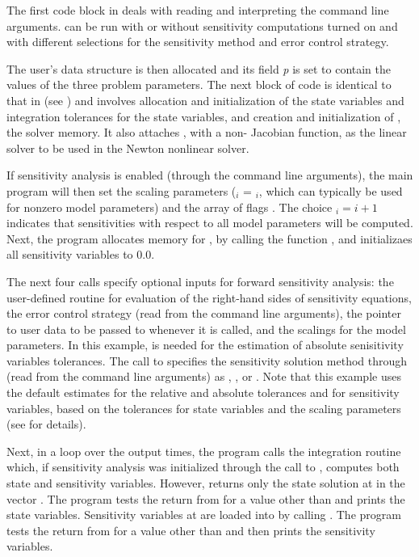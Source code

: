The first code block in  deals with reading and interpreting the
command line arguments.  can be run with or without sensitivity computations
turned on and with different selections for the sensitivity method and error control strategy.

The user's data structure is then allocated and its field {\em p} is set to contain
the values of the three problem parameters.
The next block of code is identical to that in  (see \cite{cvode2.2.0_ex})
and involves allocation and initialization of the state variables and integration 
tolerances for the state variables, and creation and initialization of , 
the {\cvodes} solver memory. 
It also attaches {\cvdense}, with a non- Jacobian function, as the linear solver 
to be used in the Newton nonlinear solver.

If sensitivity analysis is enabled (through the command line arguments), 
the main program will then set the scaling parameters
 ($_i$ = $_i$, which can typically be used for 
nonzero model parameters) and the array of flags . The choice $_i=i+1$
indicates that sensitivities with respect to all model parameters will be computed.
Next, the program allocates memory for , by calling the {\nvecs} function 
, and initializaes all sensitivity variables to $0.0$.

The next four calls specify optional inputs for forward sensitivity analysis:
the user-defined routine for evaluation of the right-hand
sides of sensitivity equations, the error control strategy
(read from the command line arguments), the pointer to
user data to be passed to  whenever it is called, and  
the scalings for the model parameters. In this example,  is needed for the 
estimation of absolute senisitivity variables tolerances.
The call to  specifies the sensitivity solution method through 
 (read from the command line arguments) as , 
, or .
Note that this example uses the default estimates for the relative and absolute tolerances 
 and  for sensitivity variables, based on the tolerances for state 
variables and the scaling parameters  (see  for details).

Next, in a loop over the  output times, the program calls the integration
routine  which, if sensitivity analysis was initialized through the call
to , computes both state and sensitivity variables. However,
 returns only the state solution at  in the vector .
The program tests the return from  for a value other than  and
prints the state variables.
Sensitivity variables at  are loaded into  by calling .
The program tests the return from  for a value other than  
and then prints the sensitivity variables.

